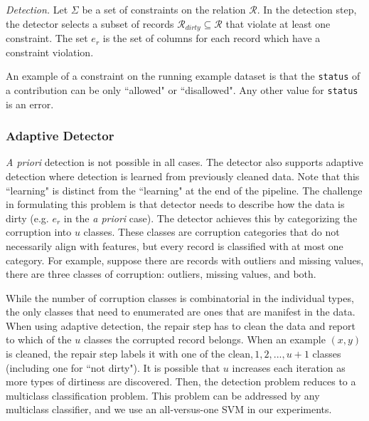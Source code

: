 \vspace{0.5em}

\emph{Detection. } Let $\Sigma$ be a set of constraints on the relation $\mathcal{R}$. 
In the detection step, the detector selects a subset of records $\mathcal{R}_{dirty} \subseteq \mathcal{R}$ that violate at least one constraint.
The set $e_r$ is the set of columns for each record which have a constraint violation. 

\begin{example}\label{detex1}
An example of a constraint on the running example dataset is that the \texttt{status} of
a contribution can be only ``allowed" or ``disallowed".
Any other value for \texttt{status} is an error.
\end{example}

\subsubsection{Adaptive Detector}
\emph{A priori} detection is not possible in all cases.
The detector also supports adaptive detection where detection is learned from previously cleaned data.
Note that this ``learning" is distinct from the ``learning" at the end of the pipeline.
The challenge in formulating this problem is that detector needs to describe how the data is dirty (e.g. $e_r$ in the \emph{a priori} case).
The detector achieves this by categorizing the corruption into $u$ classes.
These classes are corruption categories that do not necessarily align with features, but every record is classified with at most one category.
For example, suppose there are records with outliers and missing values, there are three classes of corruption: outliers, missing values, and both.

While the number of corruption classes is combinatorial in the individual types, the only classes that need to enumerated are ones that are manifest in the data.
When using adaptive detection, the repair step has to clean the data and report to which of the $u$ classes the corrupted record belongs.
When an example $(x,y)$ is cleaned, the repair step labels it with one of the ${\text{clean}, 1,2,...,u+1}$ classes (including one for ``not dirty").
It is possible that $u$ increases each iteration as more types of dirtiness are discovered. 
Then, the detection problem reduces to a multiclass classification problem.
This problem can be addressed by any multiclass classifier, and we use an all-versus-one SVM in our experiments.

